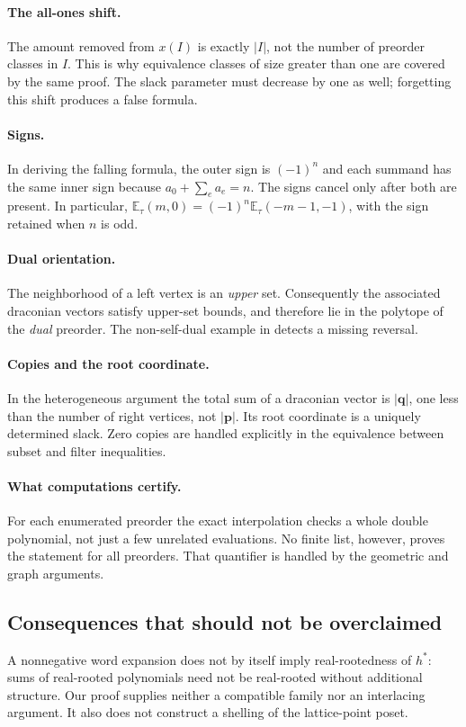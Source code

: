 \documentclass[11pt,letterpaper]{article}
\theoremstyle{definition}
\newcommand{\pvec}{\mathbf p}
\newcommand{\qvec}{\mathbf q}
\newcommand{\EE}{\mathbb E}
\newcommand{\card}[1]{\lvert #1\rvert}
\newcommand{\sumv}[1]{\lvert #1\rvert}
\begin{document}
\paragraph{The all-ones shift.}
The amount removed from $x(I)$ is exactly $\card I$, not the number of
preorder classes in $I$. This is why equivalence classes of size greater
than one are covered by the same proof. The slack parameter must decrease
by one as well; forgetting this shift produces a false formula.

\paragraph{Signs.}
In deriving the falling formula, the outer sign is $(-1)^n$ and each
summand has the same inner sign because
$a_0+\sum_ea_e=n$. The signs cancel only after both are present. In
particular,
$\EE_\tau(m,0)=(-1)^n\EE_\tau(-m-1,-1)$, with the sign retained when
$n$ is odd.

\paragraph{Dual orientation.}
The neighborhood of a left vertex is an \emph{upper} set. Consequently the
associated draconian vectors satisfy upper-set bounds, and therefore lie
in the polytope of the \emph{dual} preorder. The non-self-dual example in
 detects a missing reversal.

\paragraph{Copies and the root coordinate.}
In the heterogeneous argument the total sum of a draconian vector is
$\sumv{\qvec}$, one less than the number of right vertices, not
$\sumv{\pvec}$. Its root coordinate is a uniquely determined slack.
Zero copies are handled explicitly in the equivalence between subset and
filter inequalities.

\paragraph{What computations certify.}
For each enumerated preorder the exact interpolation checks a whole double
polynomial, not just a few unrelated evaluations. No finite list, however,
proves the statement for all preorders. That quantifier is handled by the
geometric and graph arguments.

\subsection{Consequences that should not be overclaimed}
A nonnegative word expansion does not by itself imply real-rootedness of
$h^*$: sums of real-rooted polynomials need not be real-rooted without
additional structure. Our proof supplies neither a compatible family nor
an interlacing argument. It also does not construct a shelling of the
lattice-point poset.
\end{document}
